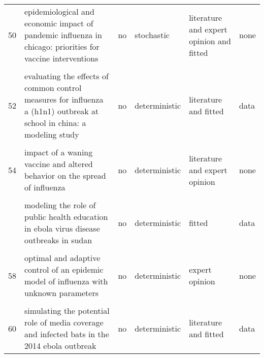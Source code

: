 \documentclass[
]{article}
\begin{document}
\begin{landscape}
\begin{longtable}{l>{\raggedright\arraybackslash}p{3cm}l>{\raggedright\arraybackslash}p{3cm}ll}
50 & epidemiological and economic impact of pandemic influenza in chicago: priorities for vaccine interventions & no & stochastic & literature and expert opinion and fitted & none\\
\addlinespace
\cellcolor{gray!6}{51} & \cellcolor{gray!6}{estimating direct and indirect protective effect of influenza vaccination in the united states} & \cellcolor{gray!6}{no} & \cellcolor{gray!6}{deterministic} & \cellcolor{gray!6}{literature and fitted} & \cellcolor{gray!6}{data}\\
52 & evaluating the effects of common control measures for influenza a (h1n1) outbreak at school in china: a modeling study & no & deterministic & literature and fitted & data\\
\cellcolor{gray!6}{53} & \cellcolor{gray!6}{evaluation of strategies to control a potential outbreak of foot-and-mouth disease in sweden} & \cellcolor{gray!6}{yes} & \cellcolor{gray!6}{stochastic} & \cellcolor{gray!6}{literature and expert opinion and fitted} & \cellcolor{gray!6}{none}\\
54 & impact of a waning vaccine and altered behavior on the spread of influenza & no & deterministic & literature and expert opinion & none\\
\cellcolor{gray!6}{55} & \cellcolor{gray!6}{mathematical models for devising the optimal ebola virus disease eradication} & \cellcolor{gray!6}{no} & \cellcolor{gray!6}{deterministic} & \cellcolor{gray!6}{literature and fitted} & \cellcolor{gray!6}{data}\\
\addlinespace
56 & modeling the role of public health education in ebola virus disease outbreaks in sudan & no & deterministic & fitted & data\\
\cellcolor{gray!6}{57} & \cellcolor{gray!6}{modelling the transmission and control strategies of varicella among school children in shenzhen, china} & \cellcolor{gray!6}{yes} & \cellcolor{gray!6}{deterministic} & \cellcolor{gray!6}{literature and fitted} & \cellcolor{gray!6}{none}\\
58 & optimal and adaptive control of an epidemic model of influenza with unknown parameters & no & deterministic & expert opinion & none\\
\cellcolor{gray!6}{59} & \cellcolor{gray!6}{simulating endogenous dynamics of intervention-capacity deployment: ebola outbreak in liberia} & \cellcolor{gray!6}{no} & \cellcolor{gray!6}{stochastic} & \cellcolor{gray!6}{literature and expert opinion} & \cellcolor{gray!6}{data}\\
60 & simulating the potential role of media coverage and infected bats in the 2014 ebola outbreak & no & deterministic & literature and fitted & data\\

\end{longtable}
\end{landscape}
\end{document}
